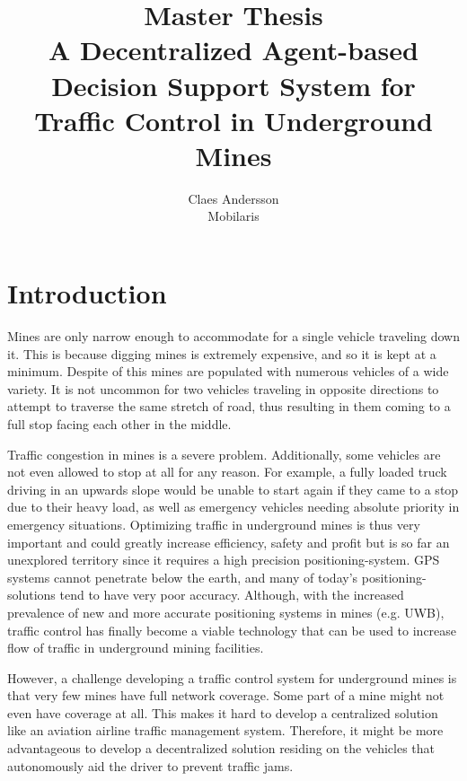 \documentclass{article}
\begin{document}
\title{\vspace{-3cm}Master Thesis\\A Decentralized Agent-based Decision Support System for Traffic Control in Underground Mines}
\author{Claes Andersson \\ Mobilaris}
\maketitle

\section*{Introduction}
Mines are only narrow enough to accommodate for a single vehicle traveling down it. This is because digging mines is extremely expensive, and so it is kept at a minimum. Despite of this mines are populated with numerous vehicles of a wide variety. It is not uncommon for two vehicles traveling in opposite directions to attempt to traverse the same stretch of road, thus resulting in them coming to a full stop facing each other in the middle.

Traffic congestion in mines is a severe problem. Additionally, some vehicles are not even allowed to stop at all for any reason. For example, a fully loaded truck driving in an upwards slope would be unable to start again if they came to a stop due to their heavy load, as well as emergency vehicles needing absolute priority in emergency situations. Optimizing traffic in underground mines is thus very important and could greatly increase efficiency, safety and profit but is so far an unexplored territory since it requires a high precision positioning-system. GPS systems cannot penetrate below the earth, and many of today’s positioning-solutions tend to have very poor accuracy. Although, with the increased prevalence of new and more accurate positioning systems in mines (e.g. UWB), traffic control has finally become a viable technology that can be used to increase flow of traffic in underground mining facilities.

However, a challenge developing a traffic control system for underground mines is that very few mines have full network coverage. Some part of a mine might not even have coverage at all. This makes it hard to develop a centralized solution like an aviation airline traffic management system. Therefore, it might be more advantageous to develop a decentralized solution residing on the vehicles that autonomously aid the driver to prevent traffic jams.
\end{document}
